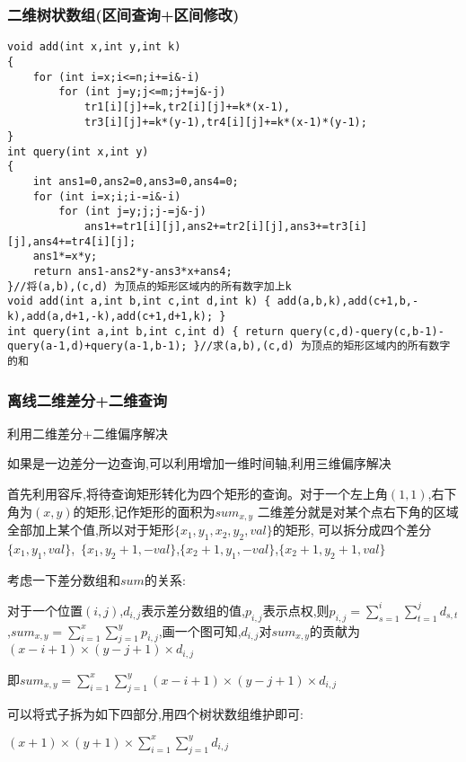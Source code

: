 \documentclass[a4paper]{ctexart}
\begin{document}
\subsubsection{二维树状数组(区间查询+区间修改)}

\begin{lstlisting}
void add(int x,int y,int k)
{
    for (int i=x;i<=n;i+=i&-i)
        for (int j=y;j<=m;j+=j&-j)
            tr1[i][j]+=k,tr2[i][j]+=k*(x-1),
    		tr3[i][j]+=k*(y-1),tr4[i][j]+=k*(x-1)*(y-1);
}
int query(int x,int y)
{
    int ans1=0,ans2=0,ans3=0,ans4=0;
    for (int i=x;i;i-=i&-i)
        for (int j=y;j;j-=j&-j)
            ans1+=tr1[i][j],ans2+=tr2[i][j],ans3+=tr3[i][j],ans4+=tr4[i][j];
    ans1*=x*y;
    return ans1-ans2*y-ans3*x+ans4;
}//将(a,b),(c,d) 为顶点的矩形区域内的所有数字加上k
void add(int a,int b,int c,int d,int k) { add(a,b,k),add(c+1,b,-k),add(a,d+1,-k),add(c+1,d+1,k); }
int query(int a,int b,int c,int d) { return query(c,d)-query(c,b-1)-query(a-1,d)+query(a-1,b-1); }//求(a,b),(c,d) 为顶点的矩形区域内的所有数字的和

\end{lstlisting}

\subsubsection{离线二维差分+二维查询}

利用二维差分+二维偏序解决

如果是一边差分一边查询,可以利用增加一维时间轴,利用三维偏序解决

首先利用容斥,将待查询矩形转化为四个矩形的查询。对于一个左上角$(1,1)$,右下角为$(x,y)$的矩形,记作矩形的面积为$sum_{x,y}$
二维差分就是对某个点右下角的区域全部加上某个值,所以对于矩形$\{x_1,y_1,x_2,y_2,val\}$的矩形,
可以拆分成四个差分$\{x_1,y_1,val\}$,\ $\{x_1,y_2+1,-val\}$,$\{x_2+1,y_1,-val\}$,$\{x_2+1,y_2+1,val\}$

考虑一下差分数组和$sum$的关系:

对于一个位置$(i,j)$,$d_{i,j}$表示差分数组的值,$p_{i,j}$表示点权,则$p_{i,j}=\sum_{s=1}^i\sum_{t=1}^jd_{s,t}$,$sum_{x,y}=\sum_{i=1}^x\sum_{j=1}^yp_{i,j}$,画一个图可知,$d_{i,j}$对$sum_{x,y}$的贡献为$(x-i+1)\times(y-j+1)\times d_{i,j}$

即$sum_{x,y}=\sum_{i=1}^x\sum_{j=1}^y(x-i+1)\times (y-j+1)\times d_{i,j}$

可以将式子拆为如下四部分,用四个树状数组维护即可:

$(x+1)\times (y+1)\times \sum_{i=1}^x\sum_{j=1}^y d_{i,j}$
\end{document}
